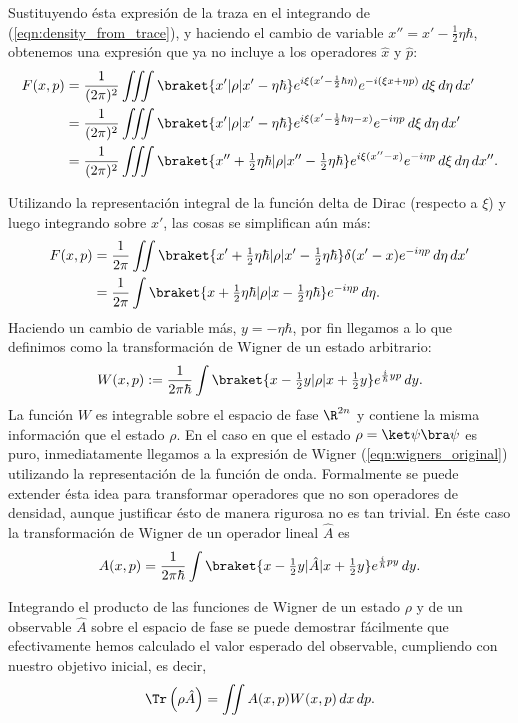   Sustituyendo ésta expresión de la traza en el integrando
  de (\ref{eqn:density_from_trace}), y haciendo el cambio de
  variable $x'' = x' - \frac{1}{2}\eta\hbar$, obtenemos una
  expresión que ya no incluye a los operadores $\hat{x}$ y
  $\hat{p}$:
  \begin{align*}
    F(x,p)
    &= \frac{1}{(2\pi)^2} \iiint \braket{x'|\rho|x' -
    \eta\hbar} e^{i\xi(x' - \frac{1}{2}\hbar \eta)}
    e^{-i(\xi x + \eta p)} \, d\xi \, d\eta \, dx'\\
    &= \frac{1}{(2\pi)^2}\iiint \braket{x'|\rho|x'-\eta
    \hbar} e^{i\xi(x' - \frac{1}{2}\hbar\eta - x)} e^{-i\eta
    p} \, d\xi \, d\eta \, dx' \\
    &= \frac{1}{(2\pi)^2}\iiint \braket{x'' + \tfrac{1}{2}
    \eta \hbar|\rho|x'' - \tfrac{1}{2} \eta \hbar}
    e^{i\xi(x'' - x)} e^{-i\eta p} \, d\xi \, d\eta \, dx''.
  \end{align*}

  Utilizando la representación integral de la función delta
  de Dirac (respecto a $\xi$) y luego integrando sobre $x'$,
  las cosas se simplifican aún más:
  \begin{align}
    F(x,p)
    &= \frac{1}{2\pi} \iint \braket{
    x'+\tfrac{1}{2}\eta\hbar | \rho|
    x'-\tfrac{1}{2}\eta\hbar} \delta(x'-x) e^{-i\eta p} \,
    d\eta \, dx' \\
    &= \frac{1}{2 \pi} \int \braket{x +
    \tfrac{1}{2}\eta\hbar | \rho | x - \tfrac{1}{2}
    \eta\hbar}e^{-i \eta p} \, d\eta.
  \end{align}
  Haciendo un cambio de variable más, $y = -\eta \hbar$, por
  fin llegamos a lo que definimos como la transformación de
  Wigner de un estado arbitrario:
  \begin{equation}
    W(x,p)
    := \frac{1}{2\pi\hbar} \int \braket{x -
      \tfrac{1}{2}y|\rho|x+\tfrac{1}{2}y} e^{\frac{i}{\hbar}
    y p} \, dy.
  \end{equation}
  La función $W$ es integrable sobre el espacio de fase
  $\R^{2n}$ y contiene la misma información que el estado
  $\rho$. En el caso en que el estado $\rho = \ket \psi \bra
  \psi$ es puro, inmediatamente llegamos a la expresión de
  Wigner (\ref{eqn:wigners_original}) utilizando la
  representación de la función de onda. Formalmente se puede
  extender ésta idea para transformar operadores que no son
  operadores de densidad, aunque justificar ésto de manera
  rigurosa no es tan trivial. En éste caso la transformación
  de Wigner de un operador lineal $\hat{A}$ es
  \begin{equation}
    A(x,p)
    = \frac{1}{2 \pi \hbar} \int
    \braket{x-\tfrac{1}{2}y|\hat{A}|x+\tfrac{1}{2}y}
    e^{\frac{i}{\hbar}p y} \, dy.
  \end{equation}

  Integrando el producto de las funciones de Wigner de un
  estado $\rho$ y de un observable $\hat{A}$ sobre el
  espacio de fase se puede demostrar fácilmente que
  efectivamente hemos calculado el valor esperado del
  observable, cumpliendo con nuestro objetivo inicial, es
  decir,
  \[
    \Tr\left( \rho\hat{A} \right) 
    = \iint A(x,p)W(x,p) \, dx \, dp.
  \] 
